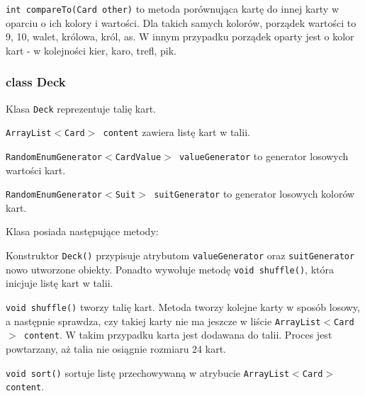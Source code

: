 \documentclass{article}
\begin{document}
\texttt{int compareTo(Card other)} to metoda porównująca  kartę do innej karty w oparciu o ich kolory i wartości. Dla takich samych kolorów, porządek wartości to 9, 10, walet, królowa, król, as. W innym przypadku porządek oparty jest o kolor kart - w kolejności kier, karo, trefl, pik.

\subsubsection*{class Deck}

\begin{center}
\end{center}

Klasa \texttt{Deck} reprezentuje talię kart.

\texttt{ArrayList$<$Card$>$ content} zawiera listę kart w talii. 

\texttt{RandomEnumGenerator$<$CardValue$>$ valueGenerator} to generator losowych wartości kart.

\texttt{RandomEnumGenerator$<$Suit$>$ suitGenerator} to generator losowych kolorów kart.

Klasa posiada następujące metody:

Konstruktor \texttt{Deck()} przypisuje atrybutom \texttt{valueGenerator} oraz \texttt{suitGenerator} nowo utworzone obiekty. Ponadto wywołuje metodę \texttt{void shuffle()}, która inicjuje listę kart w talii.

\texttt{void shuffle()} tworzy talię kart. Metoda tworzy kolejne karty w sposób losowy, a następnie sprawdza, czy takiej karty nie ma jeszcze w liście \texttt{ArrayList$<$Card$>$ content}. W takim przypadku karta jest dodawana do talii. Proces jest powtarzany, aż talia nie osiągnie rozmiaru 24 kart.

\texttt{void sort()} sortuje listę przechowywaną w atrybucie \texttt{ArrayList$<$Card$>$ content}.
\end{document}
